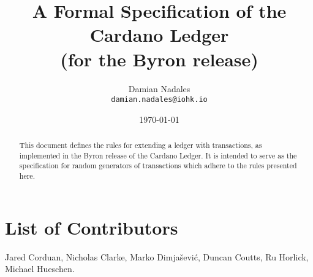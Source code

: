 
\title{
  A Formal Specification of the Cardano Ledger\\
  \small{(for the Byron release)}
}

\author{Damian Nadales \\
  {\small \texttt{damian.nadales@iohk.io}}\\
}

\date{\today}

\maketitle

\begin{abstract}
  This document defines the rules for extending a ledger with transactions, as
  implemented in the Byron release of the Cardano Ledger. It is intended to
  serve as the specification for random generators of transactions which adhere
  to the rules presented here.
\end{abstract}

\section*{List of Contributors}
\label{acknowledgements}

Jared Corduan, Nicholas Clarke, Marko Dimjašević, Duncan Coutts, Ru Horlick,
Michael Hueschen.
